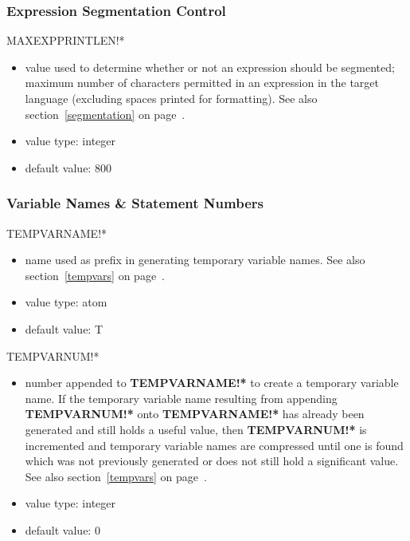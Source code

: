 \subsubsection{Expression Segmentation Control}
\begin{describe}{MAXEXPPRINTLEN!*}
\begin{itemize}
\item value used to determine whether or not an expression should be
segmented; maximum number of characters permitted in an expression
in the target language (excluding spaces printed for formatting).
See also section~\ref{segmentation} on page~\pageref{segmentation}.
\item value type:  integer
\item default value:  800
\end{itemize}
\end{describe}

\subsubsection{Variable Names \& Statement Numbers}
\begin{describe}{TEMPVARNAME!*}
\begin{itemize}
\item name used as prefix in generating temporary variable names.
See also section~\ref{tempvars} on page~\pageref{tempvars}.
\item value type:  atom
\item default value:  T
\end{itemize}
\end{describe}

\begin{describe}{TEMPVARNUM!*}
\begin{itemize}
\item number appended to {\bf TEMPVARNAME!*} to create a temporary variable
name. If the temporary variable name resulting from appending
{\bf TEMPVARNUM!*} onto {\bf TEMPVARNAME!*} has already been generated
and still holds a useful value, then {\bf TEMPVARNUM!*} is incremented
and temporary variable names are compressed until one is found which
was not previously generated or does not still hold a significant value.
See also section~\ref{tempvars} on page~\pageref{tempvars}.
\item value type:  integer
\item default value:  0
\end{itemize}
\end{describe}

